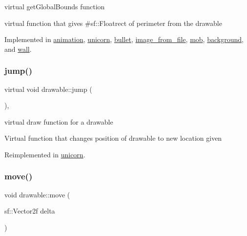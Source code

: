 virtual get\+Global\+Bounds function 

virtual function that gives \#sf\+::\+Floatrect of perimeter from the drawable 

Implemented in \hyperlink{classanimation_aae3322323bf3dea83723969f364e18e0}{animation}, \hyperlink{classunicorn_a1bac09fc59b04f14f5a093bc4daa04da}{unicorn}, \hyperlink{classbullet_a87bda5887249e8e37c5579180449bd93}{bullet}, \hyperlink{classimage__from__file_a971a591f906fa5c6e85b4e32cfc3d6a0}{image\+\_\+from\+\_\+file}, \hyperlink{classmob_af3859378fad2a5f93a1c4d833ff74d5d}{mob}, \hyperlink{classbackground_ab5f2b627cd58e0d07678f0af01c6bd2d}{background}, and \hyperlink{classwall_a317a464c879cfdf9464bd6f1b62d9101}{wall}.

\mbox{\label{classdrawable_ac39691470b7874f5dec59efe649d3981}} 
\subsubsection{\texorpdfstring{jump()}{jump()}}
{\footnotesize\ttfamily virtual void drawable\+::jump (\begin{DoxyParamCaption}{ }\end{DoxyParamCaption})\hspace{0.3cm}{\ttfamily [inline]}, {\ttfamily [virtual]}}



virtual draw function for a drawable 

Virtual function that changes position of drawable to new location given 

Reimplemented in \hyperlink{classunicorn_a07d5ca4e66632c0e871221a27146805a}{unicorn}.

\mbox{\label{classdrawable_ad0d3930c045cc6776aa2c3965be32491}} 
\subsubsection{\texorpdfstring{move()}{move()}}
{\footnotesize\ttfamily void drawable\+::move (\begin{DoxyParamCaption}\item[{sf\+::\+Vector2f}]{delta }\end{DoxyParamCaption})\hspace{0.3cm}{\ttfamily [virtual]}}



